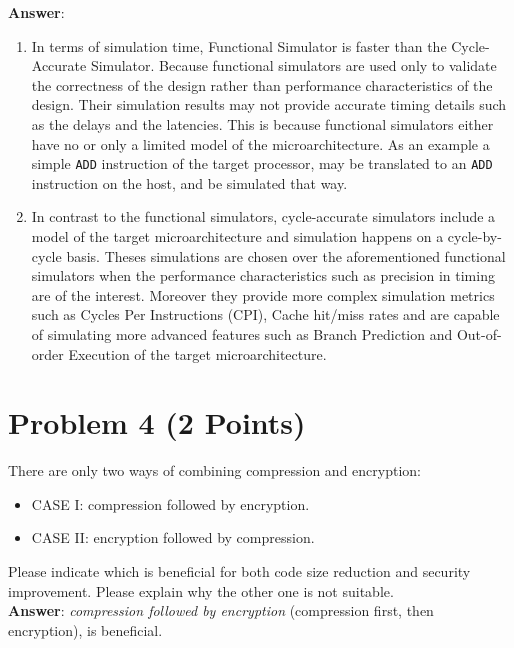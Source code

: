 \documentclass[11pt,letterpaper]{article}
\begin{document}
	\textbf{\Large Answer}:
	\begin{enumerate}
		\item In terms of simulation time, Functional Simulator is faster than the Cycle-Accurate Simulator. Because functional simulators  are used only to validate the correctness of the design rather than performance characteristics of the design. Their simulation results may not provide accurate timing details such as the delays and the latencies. This is because functional simulators either have no or only a limited model of the microarchitecture. As an example a simple {\tt ADD} instruction of the target processor, may be translated to an {\tt ADD} instruction on the host, and be simulated that way.
		
		\item In contrast to the functional simulators, cycle-accurate simulators include a model of the target microarchitecture and simulation happens on a cycle-by-cycle basis. Theses  simulations are chosen over the aforementioned functional simulators when the performance characteristics such as precision in timing are of the interest. Moreover they provide more complex simulation metrics such as  Cycles Per Instructions (CPI), Cache hit/miss rates and are capable of simulating more advanced features such as Branch Prediction and Out-of-order Execution of the target microarchitecture.
		
	\end{enumerate}
	
	

	\section*{Problem 4 (2 Points)}
	
	There are only two ways of combining compression and encryption: 
	
	\begin{itemize}
		\item CASE I: compression followed by encryption.
		\item CASE II: encryption followed by compression.
	\end{itemize}
	
	Please  indicate  which  is beneficial for both  code  size  reduction  and  security  improvement.  Please explain why the other one is not suitable.\\
	
	\textbf{\Large Answer}: \textit{compression followed by encryption} (compression first, then encryption), is beneficial.\\
	
\end{document}
